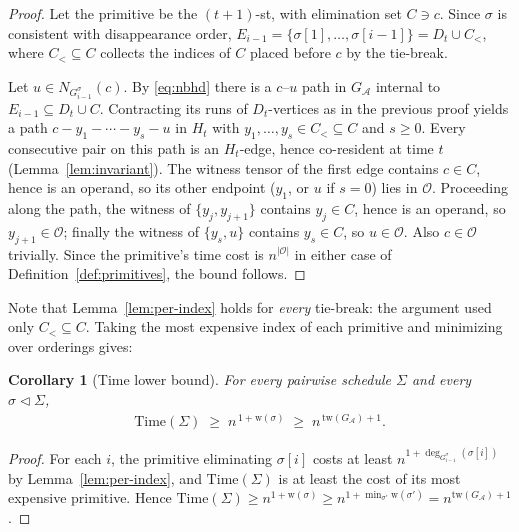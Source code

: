 \documentclass[11pt]{article}
\newcommand{\calA}{\mathcal{A}}
\newcommand{\tw}{\mathrm{tw}}
\newcommand{\treewidthp}[1]{\tw(#1)}
\newcommand{\graphform}[1]{G_{#1}}
\newcommand{\wid}{\mathrm{w}}
\newcommand{\Time}{\mathrm{Time}}
\theoremstyle{plain}
\newtheorem{corollary}{Corollary}
\theoremstyle{definition}
\theoremstyle{remark}
\begin{document}
\begin{proof}
Let the primitive be the $(t{+}1)$-st, with elimination set $C \ni c$.
Since $\sigma$ is consistent with disappearance order,
$E_{i-1} = \{\sigma[1],\dots,\sigma[i-1]\} = D_t \cup C_{<}$, where
$C_{<} \subseteq C$ collects the indices of $C$ placed before $c$ by the
tie-break.

Let $u \in N_{G^\sigma_{i-1}}(c)$.  By \eqref{eq:nbhd} there is a
$c$--$u$ path in $\graphform{\calA}$ internal to $E_{i-1} \subseteq
D_t \cup C$.  Contracting its runs of $D_t$-vertices as in the previous
proof yields a path
$c - y_1 - \cdots - y_s - u$ in $H_t$ with $y_1,\dots,y_s \in C_{<}
\subseteq C$ and $s \ge 0$.  Every consecutive pair on this path is an
$H_t$-edge, hence co-resident at time $t$ (Lemma~\ref{lem:invariant}).
The witness tensor of the first edge contains $c \in C$, hence is an
operand, so its other endpoint ($y_1$, or $u$ if $s=0$) lies in
$\mathcal{O}$.  Proceeding along the path, the witness of $\{y_j,
y_{j+1}\}$ contains $y_j \in C$, hence is an operand, so $y_{j+1} \in
\mathcal{O}$; finally the witness of $\{y_s, u\}$ contains $y_s \in C$,
so $u \in \mathcal{O}$.  Also $c \in \mathcal{O}$ trivially.  Since the
primitive's time cost is $n^{|\mathcal{O}|}$ in either case of
Definition~\ref{def:primitives}, the bound follows.
\end{proof}

Note that Lemma~\ref{lem:per-index} holds for \emph{every} tie-break: the
argument used only $C_{<} \subseteq C$.  Taking the most expensive index
of each primitive and minimizing over orderings gives:

\begin{corollary}[Time lower bound]
\label{cor:lower}
For every pairwise schedule $\Sigma$ and every
$\sigma \vartriangleleft \Sigma$,
\begin{align*}
   \Time(\Sigma) \;\ge\; n^{\,1+\wid(\sigma)}
   \;\ge\; n^{\,\treewidthp{\graphform{\calA}}+1} .
\end{align*}
\end{corollary}

\begin{proof}
For each $i$, the primitive eliminating $\sigma[i]$ costs at least
$n^{1+\deg_{G^\sigma_{i-1}}(\sigma[i])}$ by Lemma~\ref{lem:per-index}, and
$\Time(\Sigma)$ is at least the cost of its most expensive primitive.
Hence $\Time(\Sigma) \ge n^{1+\wid(\sigma)} \ge
n^{1+\min_{\sigma'}\wid(\sigma')} = n^{\treewidthp{\graphform{\calA}}+1}$.
\end{proof}
\end{document}
